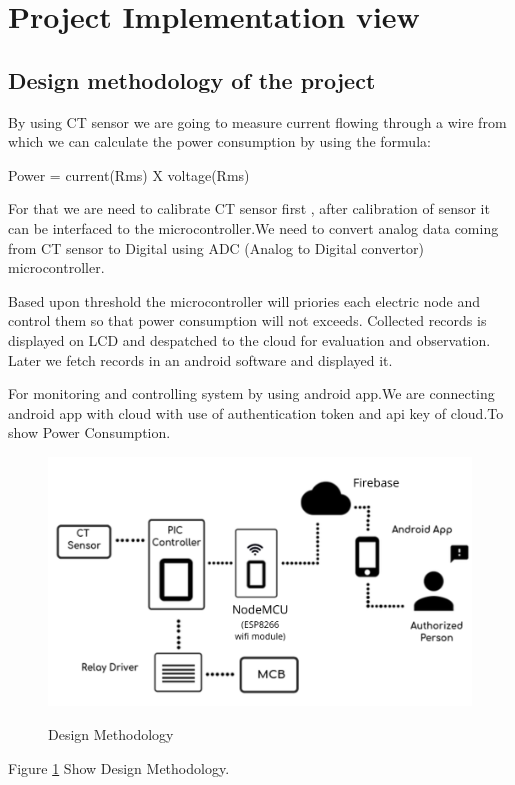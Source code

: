 \documentclass[12pt,a4paper]{article}
\begin{document}

\newpage
\pagebreak
\vspace*{\fill}%
\noindent
{}
\vfill


\newpage
\section{Project Implementation view}
\fancyfoot[R]{\thepage}

\subsection{Design methodology of the project}
\hspace{0.5cm}By using CT sensor we are going to measure current flowing through a wire from   which we can calculate the power consumption by using the formula: 
\begin{center}
                  Power = current(Rms) X voltage(Rms)
\end{center}
For that we  are need to calibrate CT sensor first , after calibration of sensor it can be interfaced  to the microcontroller.We need to convert analog data coming from  CT sensor to Digital using  ADC (Analog to Digital convertor) microcontroller.

Based upon threshold the microcontroller will priories each electric node and control them so that  power consumption will not exceeds. Collected records is displayed on LCD and despatched to the cloud for evaluation and observation. Later we fetch records in an android software and displayed it.

For monitoring and controlling system by using android app.We are connecting android app with cloud with use of authentication token and api key of cloud.To show Power Consumption.

\begin{figure}[H]
	\centering
	\includegraphics[width=\linewidth]{FirebaseAr.png}\\
	\caption{Design Methodology}
	\label{fig:5.1}
\end{figure}
\begin{center}
Figure \ref{fig:5.1} Show Design Methodology.
\end{center}
\end{document}
